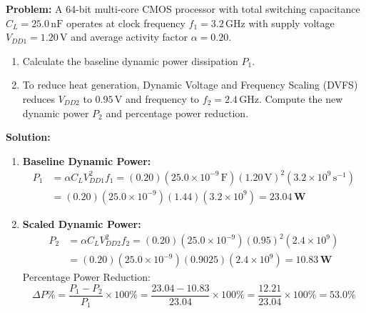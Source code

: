 \begin{examplebox}
\textbf{Problem:} A 64-bit multi-core CMOS processor with total switching capacitance $C_L = 25.0\,\text{nF}$ operates at clock frequency $f_1 = 3.2\,\text{GHz}$ with supply voltage $V_{DD1} = 1.20\,\text{V}$ and average activity factor $\alpha = 0.20$.
\begin{enumerate}[label=(\alph*)]
    \item Calculate the baseline dynamic power dissipation $P_1$.
    \item To reduce heat generation, Dynamic Voltage and Frequency Scaling (DVFS) reduces $V_{DD2}$ to $0.95\,\text{V}$ and frequency to $f_2 = 2.4\,\text{GHz}$. Compute the new dynamic power $P_2$ and percentage power reduction.
\end{enumerate}

\textbf{Solution:}
\begin{enumerate}[label=(\alph*)]
    \item \textbf{Baseline Dynamic Power:}
    \begin{align}
        P_1 &= \alpha C_L V_{DD1}^2 f_1 = (0.20)(25.0 \times 10^{-9}\,\text{F})(1.20\,\text{V})^2(3.2 \times 10^9\,\text{s}^{-1}) \\
        &= (0.20)(25.0 \times 10^{-9})(1.44)(3.2 \times 10^9) = \mathbf{23.04\,\text{W}}
    \end{align}
    \item \textbf{Scaled Dynamic Power:}
    \begin{align}
        P_2 &= \alpha C_L V_{DD2}^2 f_2 = (0.20)(25.0 \times 10^{-9})(0.95)^2(2.4 \times 10^9) \\
        &= (0.20)(25.0 \times 10^{-9})(0.9025)(2.4 \times 10^9) = \mathbf{10.83\,\text{W}}
    \end{align}
    Percentage Power Reduction:
    \begin{equation}
        \Delta P\% = \frac{P_1 - P_2}{P_1} \times 100\% = \frac{23.04 - 10.83}{23.04} \times 100\% = \frac{12.21}{23.04} \times 100\% = \mathbf{53.0\%}
    \end{equation}
\end{enumerate}
\end{examplebox}

